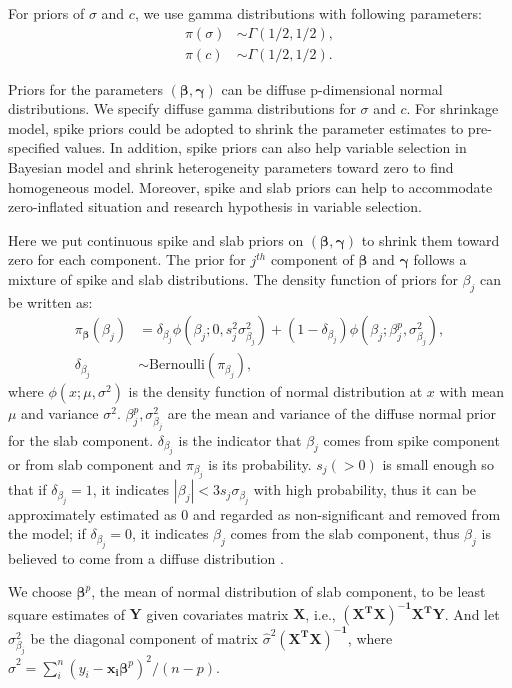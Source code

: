 \documentclass[12pt]{article}
\begin{document}
For priors of $\sigma$ and $c$, we use gamma distributions with
following parameters:
\begin{align*}
  \pi(\sigma) & \sim \Gamma (1/2, 1/2), \\
  \pi(c) & \sim \Gamma(1/2, 1/2).
\end{align*}

Priors for the parameters $(\bm{\beta}, \bm{\gamma})$ can be diffuse
p-dimensional normal distributions. We specify diffuse gamma
distributions for $\sigma$ and $c$. For shrinkage model, spike priors
could be adopted to shrink the parameter estimates to pre-specified
values. In addition, spike priors can also help variable selection in
Bayesian model and shrink heterogeneity parameters toward zero to find
homogeneous model. Moreover, spike and slab priors can help to
accommodate zero-inflated situation and research hypothesis in
variable selection.

Here we put continuous spike and slab priors on $(\bm \beta, \bm
\gamma)$ to shrink them toward zero for each component. The prior for
$j^{th}$ component of $\bm \beta$ and $\bm \gamma$ follows a mixture
of spike and slab distributions.  The density function of priors for
$\beta_j$ can be written as:
\begin{align*}
  \pi_{\bm \beta} (\beta_j) &= \delta_{\beta_j} \phi(\beta_j; 0, s_j^2
  \sigma_{\beta_j}^2) +
  (1- \delta_{\beta_j}) \phi(\beta_j; \beta_j^p, \sigma_{\beta_j}^2),\\
  \delta_{\beta_j} & \sim \text{Bernoulli} (\pi_{\beta_j}),
\end{align*}
where $\phi(x; \mu, \sigma^2)$ is the density function of normal
distribution at $x$ with mean $\mu$ and variance
$\sigma^2$. $\beta_j^p, \sigma_{\beta_j}^2$ are the mean and variance
of the diffuse normal prior for the slab component.
$\delta_{\beta_j}$ is the indicator that $\beta_j$ comes from spike
component or from slab component and $\pi_{\beta_j}$ is its
probability.  $s_j (>0)$ is small enough so that if $\delta_{\beta_j}
= 1$, it indicates $|\beta_j | < 3 s_j\sigma_{\beta_j}$ with high
probability, thus it can be approximately estimated as 0 and regarded
as non-significant and removed from the model; if $\delta_{\beta_j} =
0$, it indicates $\beta_j$ comes from the slab component, thus
$\beta_j$ is believed to come from a diffuse distribution
\citep{george1993}.

We choose $\bm \beta^p$, the mean of normal distribution of slab
component, to be least square estimates of $\bm Y$ given covariates
matrix $\bm X$, i.e., $\bm{(X^TX)^{-1}X^TY}$. And let
$\sigma_{\beta_j}^2$ be the diagonal component of matrix
$\hat{\sigma}^2 \bm{(X^TX)^{-1}}$, where $\hat{\sigma}^2 = \sum_i^n
(y_i - \bm{x_i\beta}^p)^2/(n - p)$.
\end{document}
